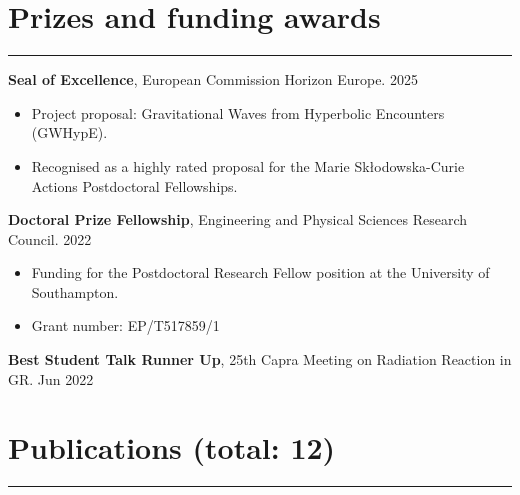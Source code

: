 \documentclass[10.5pt, oneside]{article}   	%
\begin{document}

{\color{Sectioncolour}
\section*{Prizes and funding awards}
\vspace{-3mm}
\noindent\rule{\linewidth}{0.6pt}}

\textbf{Seal of Excellence}, European Commission Horizon Europe. \hfill 2025 \\
\vspace{-5mm} 
\begin{itemize}
\item Project proposal: Gravitational Waves from Hyperbolic Encounters (GWHypE).
\item Recognised as a highly rated proposal for the Marie Skłodowska-Curie Actions Postdoctoral Fellowships.
\end{itemize}
\textbf{Doctoral Prize Fellowship}, Engineering and Physical Sciences Research Council. \hfill 2022 \\
\vspace{-5mm}
\begin{itemize}
\item Funding for the Postdoctoral Research Fellow position at the University of Southampton.
\item Grant number: EP/T517859/1
\end{itemize}
\textbf{Best Student Talk Runner Up}, 25th Capra Meeting on Radiation Reaction in GR. \hfill Jun 2022 \\
 

\newpage

{\color{Sectioncolour}
\section*{Publications {\rm (total: 12)}}
\vspace{-3mm}
\noindent\rule{\linewidth}{0.6pt}}

\nocite{*}

\vspace{-5mm}
\printbibliography[notkeyword={prep},title={~}]
\end{document}
